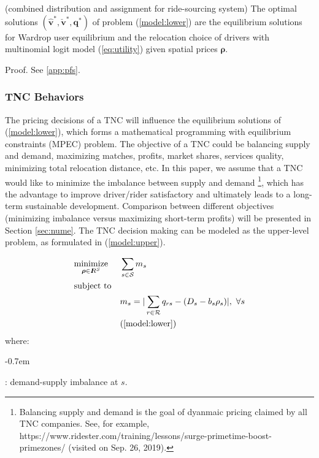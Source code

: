 \documentclass[review]{elsarticle}
\begin{document}
\begin{lemma}{(combined distribution and assignment for ride-sourcing system)}\label{lem:CDA}
The optimal solutions $(\bm{\hat{v}^\ast},\bm{\check{v}^{\ast}}, \bm{q^\ast} )$ of  problem (\ref{model:lower}) are the equilibrium solutions for Wardrop user equilibrium and the relocation choice of drivers with multinomial logit model (\ref{eq:utility}) given spatial prices $\bm{\rho}$.
\end{lemma}  

\state Proof. See \ref{app:pfs}. 
\eop

\subsubsection{TNC Behaviors}

The pricing decisions of a TNC will influence the equilibrium solutions of (\ref{model:lower}), which forms a mathematical programming with equilibrium constraints (MPEC) problem. The objective of a TNC could be balancing supply and demand, maximizing matches, profits, market shares, services quality, minimizing total relocation distance, etc. In this paper, we assume that a TNC would like to minimize the imbalance between supply and demand \footnote{Balancing supply and demand is the goal of dyanmaic pricing claimed by all  TNC companies. See, for example, https://www.ridester.com/training/lessons/surge-primetime-boost-primezones/ (visited on Sep. 26, 2019).}, which has the advantage to improve driver/rider satisfactory and ultimately leads to a long-term sustainable development. Comparison between different objectives (minimizing imbalance versus maximizing short-term profits) will be presented in Section \ref{sec:nume}. The TNC decision making can be modeled as the upper-level problem, as formulated in (\ref{model:upper}).

\begin{subequations}
\begin{align}
& \underset{\boldsymbol{\rho} \in {I\kern-.35em R}^{S}}{\text{minimize}}
& &\sum_{s \in \mathcal{S}} m_s \label{obj:upper}\\
& \text{subject to}  & & \nonumber \\
& && m_s = |\sum_{r \in \mathcal{R}} q_{rs}- ({D}_s - b_s\rho_s)|, \ \forall s \label{cons:matches}\\
& && (\ref{model:lower})
\end{align}
\label{model:upper}
\end{subequations}
where: 
\begin{description}[leftmargin=!,labelwidth=\widthof{12345}]
\itemsep-0.7em
\item[$m^{s}$] : demand-supply imbalance at $s$.
\end{description}
\end{document}
